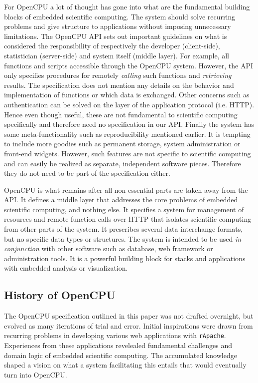 For OpenCPU a lot of thought has gone into what are the fundamental building blocks of embedded scientific computing. The system should solve recurring problems and give structure to applications without imposing unnecessary limitations. The OpenCPU API sets out important guidelines on what is considered the responsibility of respectively the developer (client-side), statistician (server-side) and system itself (middle layer). For example, all \R functions and scripts accessible through the OpenCPU system. However, the API only specifies  procedures for remotely \emph{calling} such functions and \emph{retrieving} results. The specification does not mention any details on the behavior and implementation of functions or which data is exchanged. Other concerns such as authentication can be solved on the layer of the application protocol (i.e. HTTP). Hence even though useful, these are not fundamental to scientific computing specifically and therefore need no specification in our API. Finally the system has some meta-functionality such as reproducibility mentioned earlier. It is tempting to include more goodies such as permanent storage, system administration or front-end widgets. However, such features are not specific to scientific computing and can easily be realized as separate, independent software pieces. Therefore they do not need to be part of the specification either. 

OpenCPU is what remains after all non essential parts are taken away from the API. It defines a middle layer that addresses the core problems of embedded scientific computing, and nothing else. It specifies a system for management of resources and remote function calls over HTTP that isolates scientific computing from other parts of the system. It prescribes several data interchange formats, but no specific data types or structures. The system is intended to be used \emph{in conjunction} with other software such as database, web framework or administration tools. It is a powerful building block for stacks and applications with embedded analysis or visualization. 

\subsection{History of OpenCPU}

The OpenCPU specification outlined in this paper was not drafted overnight, but evolved as many iterations of trial and error. Initial inspirations were drawn from recurring problems in developing various \R web applications with \texttt{rApache}. Experiences from these applications revelealed fundamental challenges and domain logic of embedded scientific computing. The accumulated knowledge shaped a vision on what a system facilitating this entails that would eventually turn into OpenCPU.

